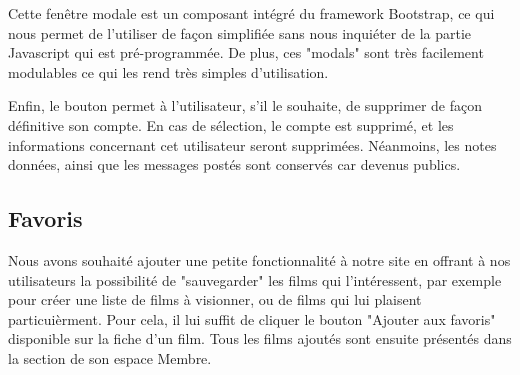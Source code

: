             \medskip
            Cette fenêtre modale est un composant intégré du framework Bootstrap, ce qui nous permet de l'utiliser de façon simplifiée sans nous inquiéter de la partie Javascript qui est pré-programmée. De plus, ces "modals" sont très facilement modulables ce qui les rend très simples d'utilisation.  

            \medskip
            Enfin, le bouton  permet à l'utilisateur, s'il le souhaite, de supprimer de façon définitive son compte. En cas de sélection, le compte est supprimé, et les informations concernant cet utilisateur seront supprimées. Néanmoins, les notes données, ainsi que les messages postés sont conservés car devenus publics.

        \subsection{Favoris}

            Nous avons souhaité ajouter une petite fonctionnalité à notre site en offrant à nos utilisateurs la possibilité de "sauvegarder" les films qui l'intéressent, par exemple pour créer une liste de films à visionner, ou de films qui lui plaisent particuièrment. Pour cela, il lui suffit de cliquer le bouton "Ajouter aux favoris" disponible sur la fiche d'un film. Tous les films ajoutés sont ensuite présentés dans la section  de son espace Membre.
